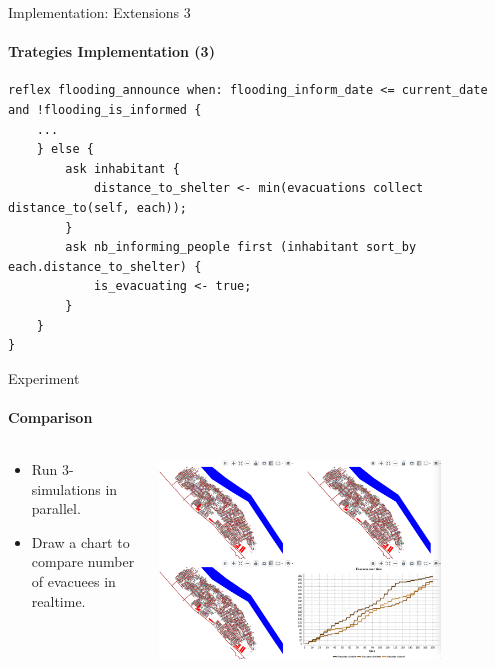 \documentclass{beamer}
\begin{document}
\begin{frame}[fragile]{Implementation: Extensions 3}
\framesubtitle{Trategies Implementation (3)}
    
\begin{lstlisting}[style=GAML]
reflex flooding_announce when: flooding_inform_date <= current_date and !flooding_is_informed {		
    ...
    } else {
        ask inhabitant {
            distance_to_shelter <- min(evacuations collect distance_to(self, each));
        }
        ask nb_informing_people first (inhabitant sort_by each.distance_to_shelter) {
            is_evacuating <- true;
        }
    }
} 
\end{lstlisting}

\end{frame}

\begin{frame}[fragile]{Experiment}
\framesubtitle{Comparison}

\begin{columns}
\begin{column}{0.4\textwidth}
\begin{itemize}
    \item Run 3-simulations in parallel.
    \item Draw a chart to compare number of evacuees in realtime.
\end{itemize}
\end{column}

\begin{column}{0.6\textwidth}
    \includegraphics[width=0.8\textwidth]{img/Comparison-Experiment.png}
\end{column}

\end{columns}

\end{frame}
\end{document}
